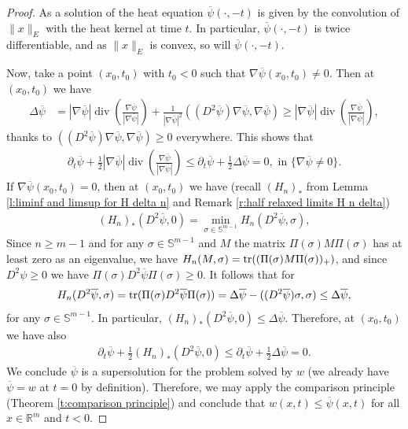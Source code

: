 \documentclass[reqno]{amsart}
\numberwithin{equation}{section}
\DeclareMathOperator{\dive}{div}
\DeclareMathOperator{\tr}{\mathrm\mathrm{tr}}
\begin{document}
\begin{proof}

As a solution of the heat equation $\overline{\psi}(\cdot,-t)$ is given by the convolution of $\|x\|_E$ with the heat kernel at time $t$. In particular, $\overline{\psi}(\cdot,-t)$ is twice differentiable, and as $\|x\|_E$ is convex, so will $\overline{\psi}(\cdot,-t)$. 

Now, take a point $(x_0,t_0)$ with $t_0<0$ such that $\nabla \overline{\psi}(x_0,t_0) \neq 0$. Then at $(x_0,t_0)$ we have 
\begin{align*}
  \Delta \overline{\psi} & = |\nabla \overline{\psi}|\dive \left (\frac{\nabla \overline{\psi}}{|\nabla \overline{\psi}|} \right ) + \frac{1}{|\nabla \overline{\psi}|^2}((D^2\overline{\psi})\nabla \overline{\psi},\nabla \overline{\psi}) \geq |\nabla \overline{\psi}|\dive \left (\frac{\nabla \overline{\psi}}{|\nabla \overline{\psi}|} \right ),
\end{align*}
thanks to $((D^2\overline{\psi})\nabla \overline{\psi},\nabla \overline{\psi})\geq 0$ everywhere. This shows that
\begin{align*}
  \partial_t \overline{\psi} +\tfrac{1}{2}|\nabla \overline{\psi}|\dive\left ( \frac{\nabla \overline{\psi}}{|\nabla \overline{\psi}|} \right) \leq \partial_t \overline{\psi} + \tfrac{1}{2} \Delta \overline{\psi} = 0, \text{ in } \{ \nabla \overline{\psi}\neq 0\}.
\end{align*}
If $\nabla \overline{\psi}(x_0,t_0) = 0$, then at $(x_0,t_0)$ we have (recall $(H_n)_*$ from Lemma \ref{l:liminf and limsup for H delta n} and Remark \ref{r:half relaxed limits H n delta})
\begin{align*}
  (H_n)_*(D^2\overline{\psi},0) = \min_{\sigma\in\mathbb{S}^{m-1}} H_n(D^2\overline \psi,\sigma),
\end{align*}
Since $n\geq m-1$ and for any $\sigma \in \mathbb{S}^{m-1}$ and $M$ the matrix $\Pi(\sigma)M\Pi(\sigma)$ has at least zero as an eigenvalue, we have $H_n(M,\sigma) = \tr((\Pi(\sigma)M\Pi(\sigma))_+)$, and since $D^2\psi \geq 0$ we have $\Pi(\sigma)D^2\overline \psi\Pi(\sigma)\geq 0$. It follows that for
\begin{align*}
  H_n(D^2\overline\psi,\sigma) = \tr(\Pi(\sigma)D^2\overline \psi\Pi(\sigma)) = \Delta \overline \psi - ((D^2\overline \psi) \sigma,\sigma) \leq \Delta \overline \psi,
\end{align*}
for any $\sigma \in \mathbb{S}^{m-1}$. In particular, $(H_n)_*(D^2\overline \psi,0) \leq \Delta \overline \psi$. Therefore, at $(x_0,t_0)$ we have also
\begin{align*}
  \partial_t \overline{\psi} + \tfrac{1}{2}(H_n)_*(D^2\overline{\psi},0) \leq \partial_t \overline{\psi} +\tfrac{1}{2} \Delta \overline{\psi} = 0.  
\end{align*}
We conclude $\overline{\psi}$ is a supersolution for the problem solved by $w$ (we already have  $\overline{\psi} = w$ at $t=0$ by definition). Therefore, we may apply the comparison principle (Theorem \ref{t:comparison principle}) and conclude that $w(x,t)\leq \overline{\psi}(x,t)$ for all $x\in\mathbb{R}^m$ and $t<0$.

\end{proof}
\end{document}
